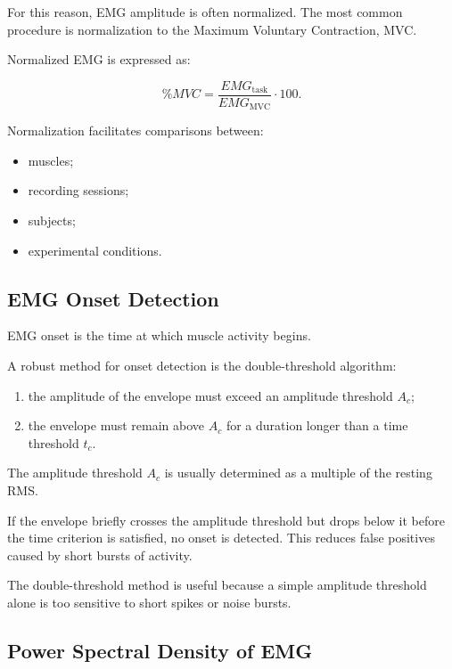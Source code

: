 For this reason, EMG amplitude is often normalized. The most common procedure is normalization to the Maximum Voluntary Contraction, MVC.

Normalized EMG is expressed as:

\[
\%MVC =
\frac{EMG_{\text{task}}}{EMG_{\text{MVC}}}
\cdot 100.
\]

Normalization facilitates comparisons between:

\begin{itemize}[noitemsep]
    \item muscles;
    \item recording sessions;
    \item subjects;
    \item experimental conditions.
\end{itemize}

\subsection{EMG Onset Detection}

EMG onset is the time at which muscle activity begins.

A robust method for onset detection is the double-threshold algorithm:

\begin{enumerate}[noitemsep]
    \item the amplitude of the envelope must exceed an amplitude threshold $A_c$;
    \item the envelope must remain above $A_c$ for a duration longer than a time threshold $t_c$.
\end{enumerate}

The amplitude threshold $A_c$ is usually determined as a multiple of the resting RMS.

If the envelope briefly crosses the amplitude threshold but drops below it before the time criterion is satisfied, no onset is detected. This reduces false positives caused by short bursts of activity.

\begin{authornote}
The double-threshold method is useful because a simple amplitude threshold alone is too sensitive to short spikes or noise bursts.
\end{authornote}

\subsection{Power Spectral Density of EMG}

